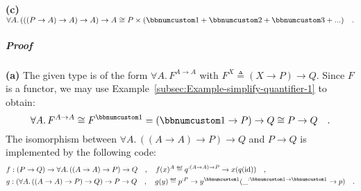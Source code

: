\textbf{(c)} $\forall A.\,(((P\rightarrow A)\rightarrow A)\rightarrow A)\rightarrow A\cong P\times(\bbnum 1+\bbnum 2+\bbnum 3+...)\quad.$

\subparagraph{Proof}

\textbf{(a)} The given type is of the form $\forall A.\,F^{A\rightarrow A}$
with $F^{X}\triangleq(X\rightarrow P)\rightarrow Q$. Since $F$ is
a functor, we may use Example~\ref{subsec:Example-simplify-quantifier-1}
to obtain: 
\[
\forall A.\,F^{A\rightarrow A}\cong F^{\bbnum 1}=(\bbnum 1\rightarrow P)\rightarrow Q\cong P\rightarrow Q\quad.
\]
The isomorphism between $\forall A.\,((A\rightarrow A)\rightarrow P)\rightarrow Q$
and $P\rightarrow Q$ is implemented by the following code:
\begin{align*}
 & f:(P\rightarrow Q)\rightarrow\forall A.\,((A\rightarrow A)\rightarrow P)\rightarrow Q\quad,\quad f(x)^{A}\triangleq q^{:(A\rightarrow A)\rightarrow P}\rightarrow x(q(\text{id}))\quad,\\
 & g:(\forall A.\,((A\rightarrow A)\rightarrow P)\rightarrow Q)\rightarrow P\rightarrow Q\quad,\quad g(y)\triangleq p^{:P}\rightarrow y^{\bbnum 1}(\_^{:\bbnum 1\rightarrow\bbnum 1}\rightarrow p)\quad.
\end{align*}

